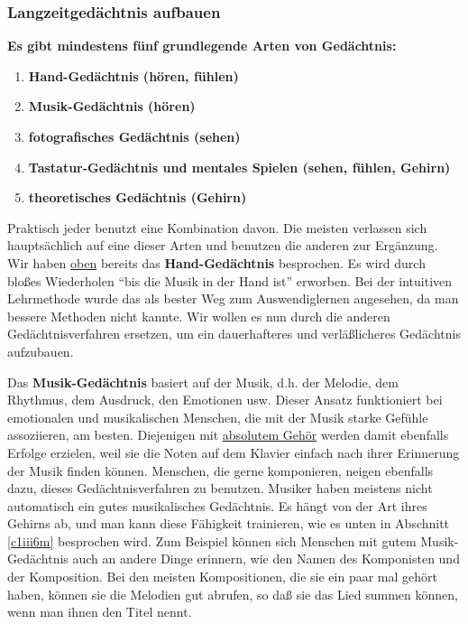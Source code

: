 
\subsubsection{Langzeitgedächtnis aufbauen}
\label{c1iii6j} 

\textbf{Es gibt mindestens fünf grundlegende Arten von Gedächtnis:}

\begin{enumerate}[label={\arabic*.}] 
\item \textbf{Hand-Gedächtnis (hören, fühlen)}
\item \textbf{Musik-Gedächtnis (hören)}
\item \textbf{fotografisches Gedächtnis (sehen)}
\item \textbf{Tastatur-Gedächtnis und mentales Spielen (sehen, fühlen, Gehirn)}
\item \textbf{theoretisches Gedächtnis (Gehirn)}
\end{enumerate}

Praktisch jeder benutzt eine Kombination davon.
Die meisten verlassen sich hauptsächlich auf eine dieser Arten und benutzen die anderen zur Ergänzung.
\label{c1iii6hand}
Wir haben \hyperref[c1iii6d]{oben} bereits das \textbf{Hand-Gedächtnis} besprochen.
Es wird durch bloßes Wiederholen \enquote{bis die Musik in der Hand ist} erworben.
Bei der intuitiven Lehrmethode wurde das als bester Weg zum Auswendiglernen angesehen, da man bessere Methoden nicht kannte.
Wir wollen es nun durch die anderen Gedächtnisverfahren ersetzen, um ein dauerhafteres und verläßlicheres Gedächtnis aufzubauen.


\label{c1iii6musik}

Das \textbf{Musik-Gedächtnis} basiert auf der Musik, d.h. der Melodie, dem Rhythmus, dem Ausdruck, den Emotionen usw.
Dieser Ansatz funktioniert bei emotionalen und musikalischen Menschen, die mit der Musik starke Gefühle assoziieren, am besten.
Diejenigen mit \hyperref[c1iii12]{absolutem Gehör} werden damit ebenfalls Erfolge erzielen, weil sie die Noten auf dem Klavier einfach nach ihrer Erinnerung der Musik finden können.
Menschen, die gerne komponieren, neigen ebenfalls dazu, dieses Gedächtnisverfahren zu benutzen.
Musiker haben meistens nicht automatisch ein gutes musikalisches Gedächtnis.
Es hängt von der Art ihres Gehirns ab, und man kann diese Fähigkeit trainieren, wie es unten in Abschnitt \hyperref[c1iii6m]{\autoref{c1iii6m}} besprochen wird.
Zum Beispiel können sich Menschen mit gutem Musik-Gedächtnis auch an andere Dinge erinnern, wie den Namen des Komponisten und der Komposition.
Bei den meisten Kompositionen, die sie ein paar mal gehört haben, können sie die Melodien gut abrufen, so daß sie das Lied summen können, wenn man ihnen den Titel nennt.


